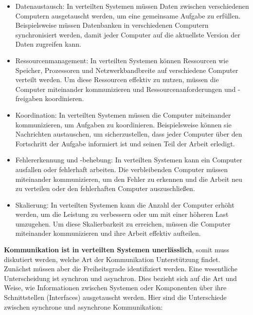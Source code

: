 \begin{itemize}
\item Datenaustausch: In verteilten Systemen müssen Daten zwischen verschiedenen Computern ausgetauscht werden, um eine gemeinsame Aufgabe zu erfüllen. Beispielsweise müssen Datenbanken in verschiedenen Computern synchronisiert werden, damit jeder Computer auf die aktuellste Version der Daten zugreifen kann.
\item Ressourcenmanagement: In verteilten Systemen können Ressourcen wie Speicher, Prozessoren und Netzwerkbandbreite auf verschiedene Computer verteilt werden. Um diese Ressourcen effektiv zu nutzen, müssen die Computer miteinander kommunizieren und Ressourcenanforderungen und -freigaben koordinieren.
\item Koordination: In verteilten Systemen müssen die Computer miteinander kommunizieren, um Aufgaben zu koordinieren. Beispielsweise können sie Nachrichten austauschen, um sicherzustellen, dass jeder Computer über den Fortschritt der Aufgabe informiert ist und seinen Teil der Arbeit erledigt.
\item Fehlererkennung und -behebung: In verteilten Systemen kann ein Computer ausfallen oder fehlerhaft arbeiten. Die verbleibenden Computer müssen miteinander kommunizieren, um den Fehler zu erkennen und die Arbeit neu zu verteilen oder den fehlerhaften Computer auszuschließen.
\item Skalierung: In verteilten Systemen kann die Anzahl der Computer erhöht werden, um die Leistung zu verbessern oder um mit einer höheren Last umzugehen. Um diese Skalierbarkeit zu erreichen, müssen die Computer miteinander kommunizieren und ihre Arbeit effektiv aufteilen.
\end{itemize}    

\textbf{Kommunikation ist in verteilten Systemen unerlässlich}, somit muss diskutiert werden, welche Art der Kommunikation Unterstützung findet. Zunächst müssen aber die Freiheitsgrade identifiziert werden. 
Eine wesentliche Unterscheidung ist synchron und asynchron. Dies bezieht sich auf die Art und Weise, wie Informationen zwischen Systemen oder Komponenten über ihre Schnittstellen (Interfaces) ausgetauscht werden. Hier sind die Unterschiede zwischen synchrone und asynchrone Kommunikation:


